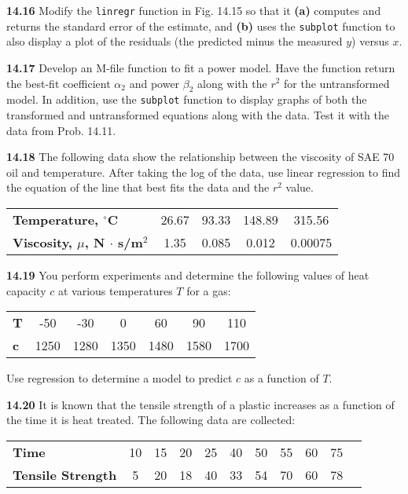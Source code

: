 \documentclass[../main.tex]{subfiles}
\begin{document}
\begin{multicols}{2}
	\noindent\textbf{14.16}  Modify the \texttt{linregr} function in Fig. 14.15 so that it
	\textbf{(a)} computes and returns the standard error of the estimate,
	and \textbf{(b)} uses the \texttt{subplot} function to also display a plot of
	the residuals (the predicted minus the measured $y$) versus $x$.

	\noindent\textbf{14.17} Develop an M-file function to fit a power model.
	Have the function return the best-fit coefficient $\alpha_2$ and
	power $\beta_2$ along with the $r^2$ for the untransformed model. In
	addition, use the \texttt{subplot} function to display graphs of both
	the transformed and untransformed equations along with the
	data. Test it with the data from Prob. 14.11.

	\noindent\textbf{14.18} The following data show the relationship between the
	viscosity of SAE 70 oil and temperature. After taking the log
	of the data, use linear regression to find the equation of the
	line that best fits the data and the $r^2$ value.

	\noindent \begin{tabular}{l c c c c}
		\textbf{Temperature, $^\circ$C} & 26.67 & 93.33 & 148.89 & 315.56 \\
		\textbf{Viscosity, $\mu$, N $\cdot$ s/m$^2$} & 1.35 & 0.085 & 0.012 & 0.00075
  	\end{tabular}

	\noindent\textbf{14.19} You perform experiments and determine the following values of heat capacity $c$ at various temperatures $T$ for a gas:

	\noindent \begin{tabular}{l c c c c c c}
		\textbf{T} & -50 & -30 & 0 & 60 & 90 & 110 \\
		\textbf{c} & 1250 & 1280 & 1350 & 1480 & 1580 & 1700
  	\end{tabular}

	\noindent Use regression to determine a model to predict $c$ as a function of $T$.

	\noindent\textbf{14.20} It is known that the tensile strength of a plastic increases as a function of the time it is heat treated. The following data are collected:

	\noindent \begin{tabular}{l c c c c c c c c c c}
		\textbf{Time} & 10 & 15 & 20 & 25 & 40 & 50 & 55 & 60 & 75 \\
		\textbf{Tensile Strength} & 5 & 20 & 18 & 40 & 33 & 54 & 70 & 60 & 78
  	\end{tabular}


\end{multicols}
\end{document}
